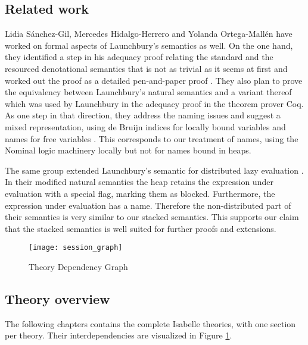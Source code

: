 \documentclass[11pt,a4paper,parskip=half]{scrartcl}
\begin{document}


\subsection{Related work}

Lidia Sánchez-Gil, Mercedes Hidalgo-Herrero and Yolanda Ortega-Mallén have worked on formal aspects of Launchbury’s semantics as well. On the one hand, they identified a step in his adequacy proof relating the standard and the resourced denotational semantics that is not as trivial as it seems at first and worked out the proof as a detailed pen-and-paper proof \cite{functionspaces}. They also plan to prove the equivalency between Launchbury’s natural semantics and a variant thereof which was used by Launchbury in the adequacy proof in the theorem prover Coq. As one step in that direction, they address the naming issues and suggest a mixed representation, using de Bruijn indices for locally bound variables and names for free variables \cite{nameless}. This corresponds to our treatment of names, using the Nominal logic machinery locally but not for names bound in heaps.

The same group extended Launchbury’s semantic for distributed lazy evaluation \cite{distributed}. In their modified natural semantics the heap retains the expression under evaluation with a special flag, marking them as blocked. Furthermore, the expression under evaluation has a name. Therefore the non-distributed part of their semantics is very similar to our stacked semantics. This supports our claim that the stacked semantics is well suited for further proofs and extensions.

\begin{figure}
\begin{center}
  \texttt{[image: session\_graph]}
\end{center}
\caption{Theory Dependency Graph\label{theory-deps}}
\end{figure}

\subsection{Theory overview}

The following chapters contains the complete Isabelle theories, with one section per theory. Their interdependencies are visualized in Figure \ref{theory-deps}.
\end{document}
